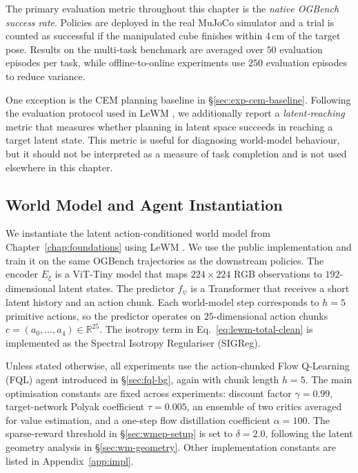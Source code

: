 The primary evaluation metric throughout this chapter is the
\emph{native OGBench success rate}. Policies are deployed in the real
MuJoCo simulator and a trial is counted as successful if the manipulated
cube finishes within $4$\,cm of the target pose. Results on the
multi-task benchmark are averaged over $50$ evaluation episodes per
task, while offline-to-online experiments use $250$ evaluation episodes
to reduce variance.

One exception is the CEM planning baseline in
\S\ref{sec:exp-cem-baseline}. Following the evaluation protocol used in
LeWM \cite{maes2026leworldmodelstableendtoendjointembedding},
we additionally report a \emph{latent-reaching} metric that measures
whether planning in latent space succeeds in reaching a target latent
state. This metric is useful for diagnosing world-model behaviour, but
it should not be interpreted as a measure of task completion and is not
used elsewhere in this chapter.

\subsection{World Model and Agent Instantiation}
\label{sec:exp-wm-instantiation}

We instantiate the latent action-conditioned world model from
Chapter~\ref{chap:foundations} using LeWM
\cite{maes2026leworldmodelstableendtoendjointembedding}. We use the
public implementation and train it on the same OGBench trajectories as
the downstream policies. The encoder $E_\xi$ is a ViT-Tiny model
\cite{dosovitskiy2021vit,touvron2021deit} that maps $224\times224$ RGB
observations to $192$-dimensional latent states. The predictor
$f_\psi$ is a Transformer that receives a short latent history and an
action chunk. Each world-model step corresponds to $h=5$ primitive
actions, so the predictor operates on $25$-dimensional action chunks
$c=(a_0,\ldots,a_4)\in\mathbb{R}^{25}$. The isotropy term in
Eq.~\eqref{eq:lewm-total-clean} is implemented as the Spectral Isotropy
Regulariser (SIGReg).

Unless stated otherwise, all experiments use the action-chunked Flow
Q-Learning (FQL) agent introduced in \S\ref{sec:fql-bg}, again with
chunk length $h=5$. The main optimisation constants are fixed across
experiments: discount factor $\gamma=0.99$, target-network Polyak
coefficient $\tau=0.005$, an ensemble of two critics averaged for value
estimation, and a one-step flow distillation coefficient
$\alpha=100$. The sparse-reward threshold in \S\ref{sec:wmep-setup} is
set to $\delta=2.0$, following the latent geometry analysis in
\S\ref{sec:wm-geometry}. Other implementation constants are listed in
Appendix~\ref{app:impl}.

